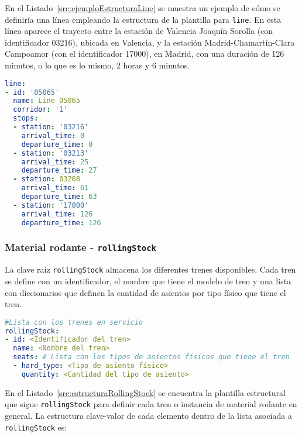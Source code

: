 En el Listado~\ref{src:ejemploEstructuraLine} se muestra un ejemplo de cómo se definiría una línea empleando la estructura de la plantilla para \texttt{line}. En esta línea aparece el trayecto entre la estación de Valencia Joaquín Sorolla (con identificador 03216), ubicada en Valencia, y la estación Madrid-Chamartín-Clara Campoamor (con el identificador 17000), en Madrid, con una duración de 126 minutos, o lo que es lo mismo, 2 horas y 6 minutos.

\begin{lstlisting}[language=YAML,
                   frame=none,
                   numbers=none,
                   basicstyle=\ttfamily\normalsize,
                   caption={Ejemplo con datos reales de la estructura de \texttt{line}},
                   label=src:ejemploEstructuraLine,
                   inputencoding=utf8]
line:
- id: '05065'
  name: Line 05065
  corridor: '1'
  stops:
  - station: '03216'
    arrival_time: 0
    departure_time: 0
  - station: '03213'
    arrival_time: 25
    departure_time: 27
  - station: 03208
    arrival_time: 61
    departure_time: 63
  - station: '17000'
    arrival_time: 126
    departure_time: 126
\end{lstlisting}

\subsubsection{Material rodante -  \texttt{rollingStock}}

La clave raíz \texttt{rollingStock} almacena los diferentes trenes disponibles. Cada tren se define con un identificador, el nombre que tiene el modelo de tren y una lista con diccionarios que definen la cantidad de asientos por tipo físico que tiene el tren.


\begin{lstlisting}[language=YAML,
                   frame=none,
                   numbers=none,
                   basicstyle=\ttfamily\normalsize,
                   caption={Estructura de la clave raíz \texttt{rollingStock}},
                   label=src:estructuraRollingStock,
                   inputencoding=utf8]
#Lista con los trenes en servicio
rollingStock:
- id: <Identificador del tren>
  name: <Nombre del tren>
  seats: # Lista con los tipos de asientos físicos que tiene el tren
  - hard_type: <Tipo de asiento físico>
    quantity: <Cantidad del tipo de asiento>
\end{lstlisting}

En el Listado~\ref{src:estructuraRollingStock} se encuentra la plantilla estructural que sigue \texttt{rollingStock} para definir cada tren o instancia de material rodante en general. La estructura clave-valor de cada elemento dentro de la lista asociada a \texttt{rollingStock} es:

